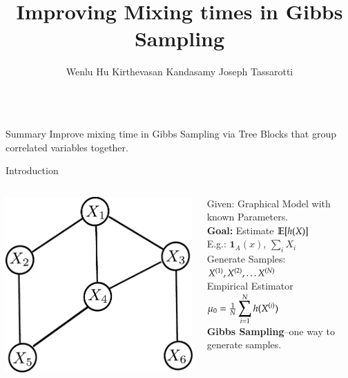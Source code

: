 \documentclass[serif,mathserif,final]{beamer}
\title{Improving Mixing times in Gibbs Sampling}
\author{Wenlu Hu \quad Kirthevasan Kandasamy \quad Joseph Tassarotti}
\institute{10-701 Introduction to Machine Learning, Course Project}
\newcommand{\itemlinespace}{0.3in}
\begin{document}
\begin{frame}{}

  \vspace{\itemlinespace}
  \begin{columns}[t]

    \begin{column}{0.49\linewidth}

      \begin{block}{\Huge Summary}
        {\huge
          Improve mixing time in Gibbs Sampling via Tree Blocks that group
          correlated variables together.
        }
      \end{block}

      \begin{block}{\Huge Introduction}
        {\huge
          \begin{columns}

          \begin{column}{5in}
            \includegraphics[width=4in]{figs/orig_graph}
          \end{column}

          \begin{column}{10in}
             Given: Graphical Model with known Parameters. \\
             \vspace{\itemlinespace}
             \textbf{Goal:} Estimate $\mathbb{E} [h(X)]$ \\
             E.g.: $\mathbf{1}_A(x)$, $\sum_i X_i$ \\
             \vspace{\itemlinespace}
            Generate Samples: $X^{(1)}, X^{(2)}, \dots X^{(N)}$ \\
            \vspace{\itemlinespace}
            Empirical Estimator \\
              $\mu_0 = \frac{1}{N} \displaystyle\sum_{i=1}^N h(X^{(i)})$ \\
            \vspace{\itemlinespace}
            \textbf{Gibbs Sampling}--one way to generate samples.
          \end{column}


\end{columns}}
\end{block}
\end{column}
\end{columns}
\end{frame}
\end{document}
